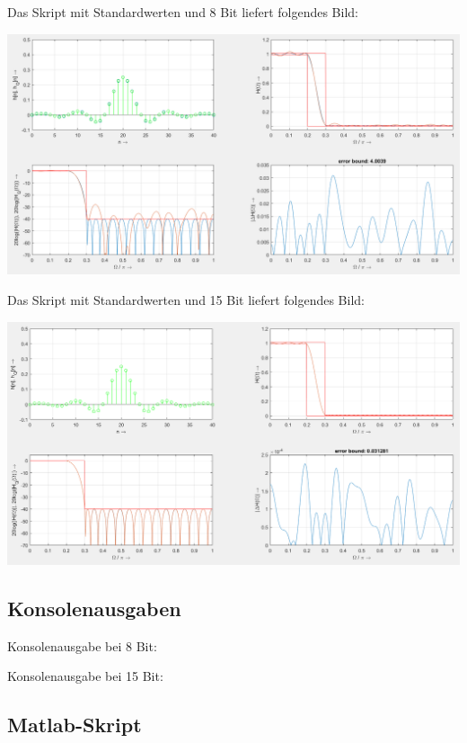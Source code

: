 Das Skript mit Standardwerten und 8 Bit liefert folgendes Bild:
\begin{center}
\includegraphics[scale=0.52]{UE02_1_8Bit.png}
\end{center}

\newpage

Das Skript mit Standardwerten und 15 Bit liefert folgendes Bild:
\begin{center}
\includegraphics[scale=0.52]{UE02_1_15Bit.png}
\end{center}

\subsection{Konsolenausgaben}

Konsolenausgabe bei 8 Bit:

Konsolenausgabe bei 15 Bit:

\subsection{Matlab-Skript}


